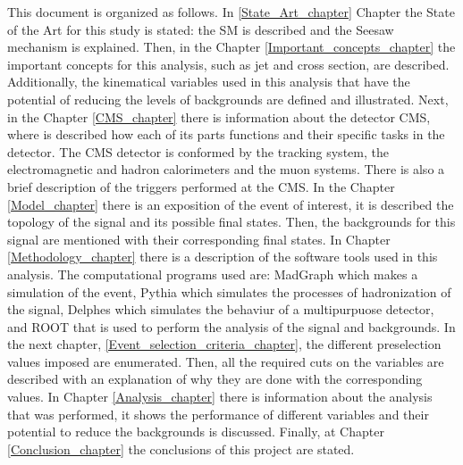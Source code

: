 This document is organized as follows. In \ref{State_Art_chapter} Chapter the State of the Art for this study is stated: the SM is described and the Seesaw mechanism is explained. Then, in the Chapter \ref{Important_concepts_chapter} the important concepts for this analysis, such as jet and cross section, are described. Additionally, the kinematical variables used in this analysis that have the potential of reducing the levels of backgrounds are defined and illustrated. Next, in the Chapter \ref{CMS_chapter} there is information about the detector CMS, where is described how each of its parts functions and their specific tasks in the detector. The CMS detector is conformed by the tracking system, the electromagnetic and hadron calorimeters and the muon systems. There is also a brief description of the triggers performed at the CMS. In the Chapter \ref{Model_chapter} there is an exposition of the event of interest, it is described the topology of the signal and its possible final states. Then, the backgrounds for this signal are mentioned with their corresponding final states. In Chapter \ref{Methodology_chapter} there is a description of the software tools used in this analysis. The computational programs used are: MadGraph which makes a simulation of the event, Pythia which simulates the processes of hadronization of the signal, Delphes which simulates the behaviur of a multipurpuose detector, and ROOT that is used to perform the analysis of the signal and backgrounds. In the next chapter, \ref{Event_selection_criteria_chapter}, the different preselection values imposed are enumerated. Then, all the required cuts on the variables are described with an explanation of why they are done with the corresponding values. In Chapter \ref{Analysis_chapter} there is information about the analysis that was performed, it shows the performance of different variables and their potential to reduce the backgrounds is discussed. Finally, at Chapter \ref{Conclusion_chapter} the conclusions of this project are stated. 
